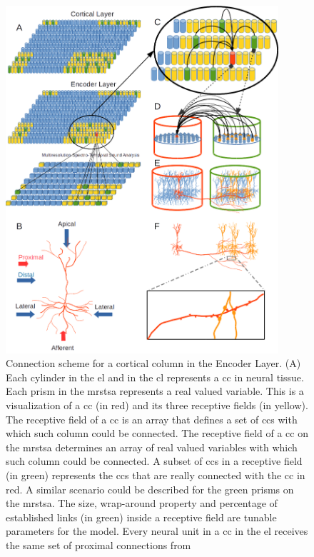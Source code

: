 \documentclass[11pt,a4paper]{article}
\begin{document}
\iffalse
\begin{figure}[h!]
    \centering
    \includegraphics[width=0.9\textwidth]{Connectivity.png}
    \caption{\tiny Connection scheme for a cortical column in the Encoder Layer.
	    (A) Each cylinder in the \gls{el} and in the \gls{cl} represents a \gls{cc} in neural tissue.
	    Each prism in the \gls{mrstsa} represents a real valued variable.
	    This is a visualization of a \gls{cc} (in red) and its three receptive fields (in yellow).
	    The receptive field of a \gls{cc} is an array that defines a set of \glspl{cc}
	    with which such column could be connected.
	    The receptive field of a \gls{cc} on the \gls{mrstsa} determines an array of real valued variables
	    with which such column could be connected.
    A subset of \glspl{cc} in a receptive field (in green) represents the \glspl{cc} that are really
    connected with the \gls{cc} in red. A similar scenario could be described for the green prisms on
    the \gls{mrstsa}.
    The size, wrap-around property and percentage of established links (in green) inside a receptive field are tunable parameters for the model.
    Every neural unit in a \gls{cc} in the \gls{el} receives the same set of proximal connections from
}
\end{figure}
\end{document}
